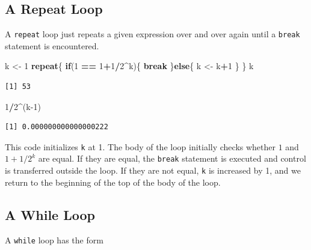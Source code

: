 \documentclass[
]{krantz}
\makeatletter
\newenvironment{Shaded}{\begin{snugshade}}{\end{snugshade}}
\newcommand{\ControlFlowTok}[1]{\textcolor[rgb]{0.27,0.27,0.27}{\textbf{#1}}}
\newcommand{\DecValTok}[1]{\textcolor[rgb]{0.06,0.06,0.06}{#1}}
\newcommand{\NormalTok}[1]{#1}
\newcommand{\OperatorTok}[1]{\textcolor[rgb]{0.43,0.43,0.43}{\textbf{#1}}}
\newcommand{\StringTok}[1]{\textcolor[rgb]{0.5,0.5,0.5}{#1}}
\newenvironment{kframe}{%
\medskip{}
\setlength{\fboxsep}{.8em}
 \def\at@end@of@kframe{}%
 \ifinner\ifhmode%
  \def\at@end@of@kframe{\end{minipage}}%
  \begin{minipage}{\columnwidth}%
 \fi\fi%
 \def\FrameCommand##1{\hskip\@totalleftmargin \hskip-\fboxsep
 \colorbox{shadecolor}{##1}\hskip-\fboxsep
     \hskip-\linewidth \hskip-\@totalleftmargin \hskip\columnwidth}%
 \MakeFramed {\advance\hsize-\width
   \@totalleftmargin\z@ \linewidth\hsize
   \@setminipage}}%
 {\par\unskip\endMakeFramed%
 \at@end@of@kframe}
\renewenvironment{Shaded}{\begin{kframe}}{\end{kframe}}
\makeatother
\begin{document}
\hypertarget{a-repeat-loop}{%
\subsection{A Repeat Loop}\label{a-repeat-loop}}

A \texttt{repeat} loop just repeats a given expression over and over again until a \texttt{break} statement is encountered.

\begin{Shaded}
\begin{Highlighting}[]
\NormalTok{k \textless{}{-}}\StringTok{ }\DecValTok{1}
\ControlFlowTok{repeat}\NormalTok{\{}
    \ControlFlowTok{if}\NormalTok{(}\DecValTok{1} \OperatorTok{==}\StringTok{ }\DecValTok{1}\OperatorTok{+}\DecValTok{1}\OperatorTok{/}\DecValTok{2}\OperatorTok{\^{}}\NormalTok{k)\{}
        \ControlFlowTok{break}
\NormalTok{    \}}\ControlFlowTok{else}\NormalTok{\{}
\NormalTok{        k \textless{}{-}}\StringTok{ }\NormalTok{k}\OperatorTok{+}\DecValTok{1}
\NormalTok{    \}}
\NormalTok{\}}
\NormalTok{k}
\end{Highlighting}
\end{Shaded}

\begin{verbatim}
[1] 53
\end{verbatim}

\begin{Shaded}
\begin{Highlighting}[]
\DecValTok{1}\OperatorTok{/}\DecValTok{2}\OperatorTok{\^{}}\NormalTok{(k}\DecValTok{{-}1}\NormalTok{)}
\end{Highlighting}
\end{Shaded}

\begin{verbatim}
[1] 0.000000000000000222
\end{verbatim}

This code initializes \texttt{k} at 1. The body of the loop initially checks whether \(1\) and \(1+1/2^k\) are equal. If they are equal, the \texttt{break} statement is executed and control is transferred outside the loop. If they are not equal, \texttt{k} is increased by 1, and we return to the beginning of the top of the body of the loop.

\hypertarget{a-while-loop}{%
\subsection{A While Loop}\label{a-while-loop}}

A \texttt{while} loop has the form
\end{document}
